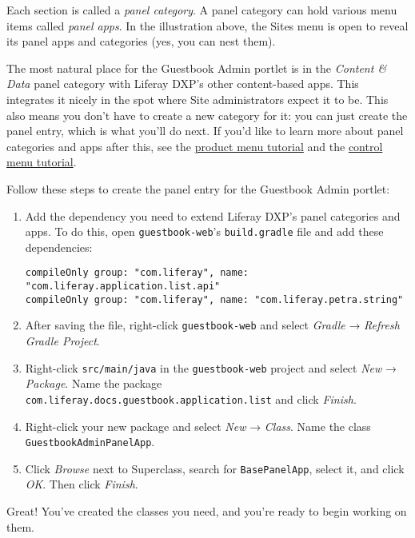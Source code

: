 Each section is called a \emph{panel category}. A panel category can
hold various menu items called \emph{panel apps}. In the illustration
above, the Sites menu is open to reveal its panel apps and categories
(yes, you can nest them).

The most natural place for the Guestbook Admin portlet is in the
\emph{Content \& Data} panel category with Liferay DXP's other
content-based apps. This integrates it nicely in the spot where Site
administrators expect it to be. This also means you don't have to create
a new category for it: you can just create the panel entry, which is
what you'll do next. If you'd like to learn more about panel categories
and apps after this, see the
\href{/docs/7-2/customization/-/knowledge_base/c/customizing-the-product-menu}{product
menu tutorial} and the
\href{/docs/7-2/customization/-/knowledge_base/c/customizing-the-control-menu}{control
menu tutorial}.

Follow these steps to create the panel entry for the Guestbook Admin
portlet:

\begin{enumerate}
\def\labelenumi{\arabic{enumi}.}
\item
  Add the dependency you need to extend Liferay DXP's panel categories
  and apps. To do this, open \texttt{guestbook-web}'s
  \texttt{build.gradle} file and add these dependencies:

\begin{verbatim}
compileOnly group: "com.liferay", name: "com.liferay.application.list.api"
compileOnly group: "com.liferay", name: "com.liferay.petra.string"
\end{verbatim}
\item
  After saving the file, right-click \texttt{guestbook-web} and select
  \emph{Gradle} → \emph{Refresh Gradle Project}.
\item
  Right-click \texttt{src/main/java} in the \texttt{guestbook-web}
  project and select \emph{New} → \emph{Package}. Name the package
  \texttt{com.liferay.docs.guestbook.application.list} and click
  \emph{Finish}.
\item
  Right-click your new package and select \emph{New} → \emph{Class}.
  Name the class \texttt{GuestbookAdminPanelApp}.
\item
  Click \emph{Browse} next to Superclass, search for
  \texttt{BasePanelApp}, select it, and click \emph{OK}. Then click
  \emph{Finish}.
\end{enumerate}

Great! You've created the classes you need, and you're ready to begin
working on them.

